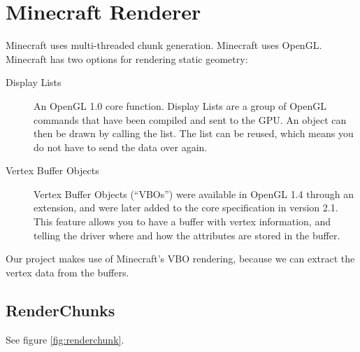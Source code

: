 \documentclass[]{article}
\begin{document}
\section{Minecraft Renderer}
Minecraft uses multi-threaded chunk generation.
Minecraft uses OpenGL.
Minecraft has two options for rendering static geometry:
\begin{description}
  \item[Display Lists] An OpenGL 1.0 core function.
    Display Lists are a group of OpenGL commands that have been compiled and sent to the GPU.
    An object can then be drawn by calling the list.
    The list can be reused, which means you do not have to send the data over again.
  \item[Vertex Buffer Objects] Vertex Buffer Objects (\enquote{VBOs}) were available in OpenGL 1.4 through an extension, and were later added to the core specification in version 2.1.
    This feature allows you to have a buffer with vertex information, and telling the driver where and how the attributes are stored in the buffer.
\end{description}
Our project makes use of Minecraft's VBO rendering, because we can extract the vertex data from the buffers.

\subsection{RenderChunks}
See figure \ref{fig:renderchunk}.
\end{document}
